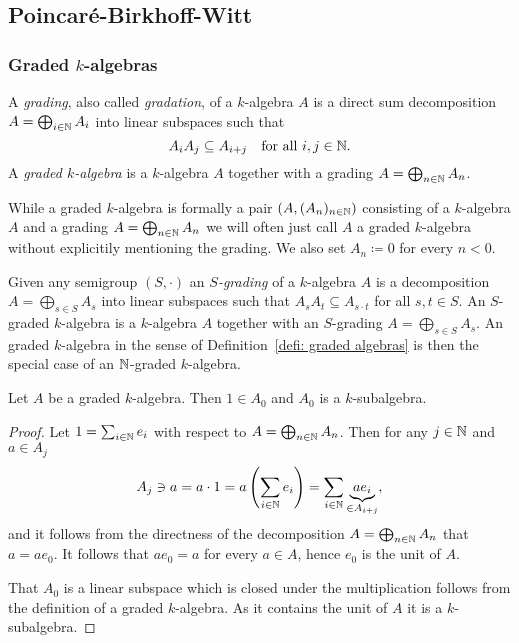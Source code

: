 \subsection{Poincar\'{e}-Birkhoff-Witt}



\subsubsection{Graded $k$-algebras}


\begin{defi}\label{defi: graded algebras}
 A \emph{grading}, also called \emph{gradation}, of a $k$-algebra $A$ is a direct sum decomposition $A = \bigoplus_{i \in \mathbb{N}} A_i$ into linear subspaces such that
 \[
  A_i A_j \subseteq A_{i+j} \quad \text{for all $i,j \in \mathbb{N}$}.
 \]
 A \emph{graded $k$-algebra} is a $k$-algebra $A$ together with a grading $A = \bigoplus_{n \in \mathbb{N}} A_n$.
\end{defi}


\begin{rem}
 While a graded $k$-algebra is formally a pair $(A, (A_n)_{n \in \mathbb{N}})$ consisting of a $k$-algebra $A$ and a grading $A = \bigoplus_{n \in \mathbb{N}} A_n$ we will often just call $A$ a graded $k$-algebra without explicitily mentioning the grading. We also set $A_n \coloneqq 0$ for every $n < 0$.
\end{rem}


\begin{rem}
 Given any semigroup $(S,\cdot)$ an \emph{$S$-grading} of a $k$-algebra $A$ is a decomposition $A = \bigoplus_{s \in S} A_s$ into linear subspaces such that $A_s A_t \subseteq A_{s \cdot t}$ for all $s,t \in S$. An $S$-graded $k$-algebra is a $k$-algebra $A$ together with an $S$-grading $A = \bigoplus_{s \in S} A_s$. An graded $k$-algebra in the sense of Definition~\ref{defi: graded algebras} is then the special case of an $\mathbb{N}$-graded $k$-algebra.
\end{rem}


\begin{lem}
 Let $A$ be a graded $k$-algebra. Then $1 \in A_0$ and $A_0$ is a $k$-subalgebra.
\end{lem}
\begin{proof}
 Let $1 = \sum_{i \in \mathbb{N}} e_i$ with respect to $A = \bigoplus_{n \in \mathbb{N}} A_n$. Then for any $j \in \mathbb{N}$ and $a \in A_j$
 \[
  A_j \ni a
  = a \cdot 1
  = a \left( \sum_{i \in \mathbb{N}} e_i \right)
  = \sum_{i \in \mathbb{N}} \underbrace{a e_i}_{\in A_{i+j}},
 \]
 and it follows from the directness of the decomposition $A = \bigoplus_{n \in \mathbb{N}} A_n$ that $a = a e_0$. It follows that $a e_0 = a$ for every $a \in A$, hence $e_0$ is the unit of $A$.
 
 That $A_0$ is a linear subspace which is closed under the multiplication follows from the definition of a graded $k$-algebra. As it contains the unit of $A$ it is a $k$-subalgebra.
\end{proof}


